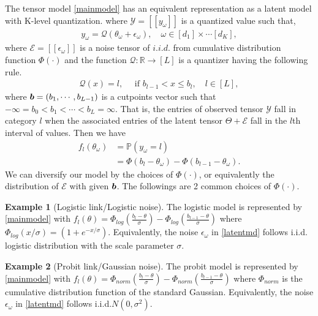 \documentclass{article}
\theoremstyle{plain}
\theoremstyle{definition}
\newtheorem{example}{Example}
\begin{document}
The tensor model \eqref{mainmodel} has an equivalent representation as a latent model with K-level quantization. \citep{Davenport20121BitMC,Lan2014MatrixRF,Bhaskar20151bitMC,Cai2013AMC} where
$\mathcal{Y} = [\![ y_\omega]\!]$ is a quantized value such that,
\begin{equation}
    \label{latentmd}
\begin{aligned}
    y_\omega = \mathcal{Q}(\theta_\omega+\epsilon_\omega),\quad \omega\in [d_1]\times\cdots[d_K],
\end{aligned}
\end{equation}
where $\mathcal{E} = [\![\epsilon_\omega]\!]$ is a noise tensor of $i.i.d.$ from cumulative distribution function $\Phi(\cdot)$ and the function $\mathcal{Q}:\mathbb{R}\rightarrow [L]$ is a quantizer having the following rule.
\begin{equation}
    \label{qfunction}
    \begin{aligned}
        \mathcal{Q}(x) = l,\quad \text{ if } b_{l-1}< x \leq b_{l},\quad l\in [L],
    \end{aligned}
\end{equation}
where $\bm{b} = (b_1,\cdots,b_{L-1})$ is a cutpoints vector such that $ -\infty = b_0<b_1<\cdots<b_L = \infty$. That is, the entries of observed tensor $\mathcal{Y}$ fall in category $l$ when the associated entries of the latent tensor $\Theta+\mathcal{E}$ fall in the $l$th interval of values. Then we have
\begin{equation}
    \label{cumulative}
    \begin{aligned}
        f_l(\theta_\omega) &= \mathbb{P}(y_\omega = l)\\
        &= \Phi(b_l-\theta_\omega)-\Phi(b_{l-1}-\theta_\omega).
    \end{aligned}
\end{equation}
We can diversify our model by the choices of $\Phi(\cdot)$, or equivalently the distribution of $\mathcal{E}$ with given $\bm{b}$.
The followings are 2 common choices of $\Phi(\cdot)$.
\begin{example}[Logistic link/Logistic noise] The logistic model is represented by \eqref{mainmodel} with $f_l(\theta) = \Phi_{log}(\frac{b_l-\theta}{\sigma})-\Phi_{log}(\frac{b_{l-1}-\theta}{\sigma})$  where $\Phi_{log}(x/\sigma) = (1+e^{-x/\sigma})$. Equivalently, the noise $\epsilon_\omega$ in \eqref{latentmd} follows i.i.d. logistic distribution with the scale parameter $\sigma.$
\end{example}

\begin{example}[Probit link/Gaussian noise] The probit model is represented by \eqref{mainmodel} with $f_l(\theta) = \Phi_{norm}(\frac{b_l-\theta}{\sigma})-\Phi_{norm}(\frac{b_{l-1}-\theta}{\sigma})$ where $\Phi_{norm}$ is the cumulative distribution function of the standard Gaussian. Equivalently, the noise $\epsilon_\omega$ in \eqref{latentmd} follows i.i.d.$N(0,\sigma^2)$.
\end{example}
\end{document}
